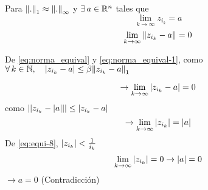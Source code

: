 {Para  $\norm{.}_1 \approx \norm{.}_{\infty}$ y  $\exists \, a \in \mathbb{R}^{n}$ tales que
$$
\lim\limits_{k\to \infty} z_{i_k}=a
$$
\begin{equation}
 \lim\limits_{k\to \infty} \norm{ z_{i_k} -a }=0 \label{eq:norma_equival-1}
\end{equation}


De \eqref{eq:norma_equival} y \eqref{eq:norma_equival-1}, como $\forall\, k \in \mathbb{N}, \quad \abs{z_{i_k}-a}\leq \beta\norm{z_{i_k}-a}_1 $

$$
\rightarrow  \lim\limits_{k\to \infty} \abs{z_{i_k}-a} = 0
$$
como $   \abs{\abs{z_{i_k} -\abs{a} }}\leq \abs{z_{i_k}-a}$
$$
\rightarrow  \lim\limits_{k\to \infty} \abs{z_{i_k}}=\abs{a}
$$
De \eqref{eq:equi-8}, $\abs{z_{i_k} }< \frac{1}{i_k}$
$$
\lim\limits_{k \to \infty} \abs{z_{i_k}} = 0 \rightarrow \abs{a}=0
$$
$\rightarrow a=0$ (Contradicción)

}



